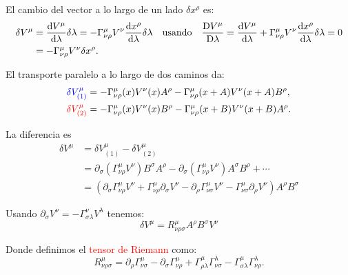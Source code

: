 \documentclass[../main]{subfiles}
\begin{document}
El cambio del vector a lo largo de un lado $\delta x^{\rho}$ es:
\begin{equation}
    \begin{split}
        \delta V^{\mu}&=\dv{V^{\mu}}{\lambda}\delta \lambda = -\Gamma^{\mu}_{\nu\rho} V^{\nu} \dv{x^{\rho}}{\lambda} \delta \lambda \quad \text{usando} \quad \dfrac{\mathrm{D}V^{\mu}}{\mathrm{D}\lambda}=\dv{V^{\mu}}{\lambda}+\Gamma^{\mu}_{\nu\rho}V^{\nu}\dv{x^{\rho}}{\lambda}\delta\lambda=0\\
        &=-\Gamma^{\mu}_{\nu\rho}V^{\nu}\delta x^{\rho}.
    \end{split}
\end{equation}

El transporte paralelo a lo largo de dos caminos da:
\begin{align}
    \textcolor{blue}{\delta V^{\mu}_{(1)}}&=-\Gamma^{\mu}_{\nu\rho}(x)V^{\nu}(x)A^{\rho}-\Gamma^{\mu}_{\nu\rho}(x+A)V^{\nu}(x+A)B^{\rho},\\
    \textcolor{red}{\delta V^{\mu}_{{(2)}}}&=-\Gamma^{\mu}_{\nu\rho}(x)V^{\nu}(x)B^{\rho}-\Gamma^{\mu}_{\nu\rho}(x+B)V^{\nu}(x+B)A^{\rho}.
\end{align}

La diferencia es 
\begin{equation}
    \begin{split}
        \delta V^{\mu} &= \delta V^{\mu}_{(1)}-\delta V^{\mu}_{(2)}\\
        &=\partial_{\sigma}\left(\Gamma^{\mu}_{\nu\rho}V^{\nu}\right)B^{\sigma}A^{\rho}-\partial_{\sigma}(\Gamma^{\mu}_{\nu\rho}V^{\nu})A^{\sigma}B^{\rho}+\cdots \\
        &=\left(\partial_{\sigma}\Gamma^{\mu}_{\nu\rho}V^{\nu}+\Gamma^{\mu}_{\nu\rho}\partial_{\sigma}V^{\nu}-\partial_{\rho}\Gamma^{\mu}_{\nu\sigma}V^{\nu}-\Gamma^{\mu}_{\nu\sigma}\partial_{\rho}V^{\nu}\right)A^{\rho}B^{\sigma}
    \end{split}
\end{equation}

Usando $\partial_{\sigma}V^{\nu}=-\Gamma^{\nu}_{\sigma\lambda}V^{\lambda}$ tenemos:
\begin{equation}
    \delta V^{\mu}=R^{\mu}_{\nu\rho\sigma}A^{\rho}B^{\sigma}V^{\nu}
\end{equation}

Donde definimos el \textcolor{red}{tensor de Riemann} como:
\begin{equation}
    R^{\mu}_{\nu\rho\sigma}=\partial_{\rho}\Gamma^{\mu}_{\nu\sigma}-\partial_{\sigma}\Gamma^{\mu}_{\nu\rho}+\Gamma^{\mu}_{\rho\lambda}\Gamma^{\lambda}_{\nu\sigma}-\Gamma^{\mu}_{\sigma\lambda}\Gamma^{\lambda}_{\nu\rho}.
\end{equation}
\end{document}
